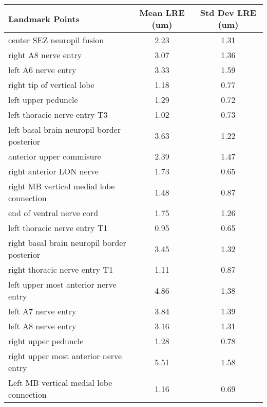 \begin{tabular}{lcc}
\hline
 ﻿Landmark Points                            & Mean LRE (um) & Std Dev LRE (um) \\ \hline \hline
 center SEZ neuropil fusion                  & 2.23          & 1.31             \\
 right A8 nerve entry                        & 3.07          & 1.36             \\
 left A6 nerve entry                         & 3.33          & 1.59             \\
 right tip of vertical lobe                  & 1.18          & 0.77             \\
 left upper peduncle                         & 1.29          & 0.72             \\
 left thoracic nerve entry T3                & 1.02          & 0.73             \\
 left basal brain neuropil border posterior  & 3.63          & 1.22             \\
 anterior upper commisure                    & 2.39          & 1.47             \\
 right anterior LON nerve                    & 1.73          & 0.65             \\
 right MB vertical medial lobe connection    & 1.48          & 0.87             \\
 end of ventral nerve cord                   & 1.75          & 1.26             \\
 left thoracic nerve entry T1                & 0.95          & 0.65             \\
 right basal brain neuropil border posterior & 3.45          & 1.32             \\
 right thoracic nerve entry T1               & 1.11          & 0.87             \\
 left upper most anterior nerve entry        & 4.86          & 1.38             \\
 left A7 nerve entry                         & 3.84          & 1.39             \\
 left A8 nerve entry                         & 3.16          & 1.31             \\
 right upper peduncle                        & 1.28          & 0.78             \\
 right upper most anterior nerve entry       & 5.51          & 1.58             \\
 Left MB vertical medial lobe connection     & 1.16          & 0.69             \\

\end{tabular}
